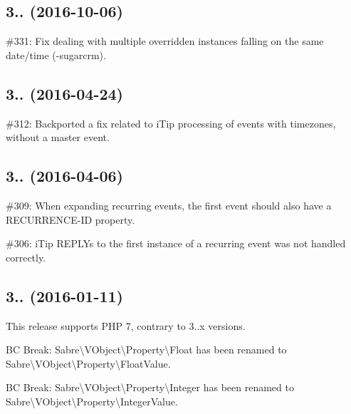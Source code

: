 \subsection*{3.. (2016-\/10-\/06) }


\begin{DoxyItemize}
\item \#331\+: Fix dealing with multiple overridden instances falling on the same date/time (-\/sugarcrm).
\end{DoxyItemize}

\subsection*{3.. (2016-\/04-\/24) }


\begin{DoxyItemize}
\item \#312\+: Backported a fix related to i\+Tip processing of events with timezones, without a master event.
\end{DoxyItemize}

\subsection*{3.. (2016-\/04-\/06) }


\begin{DoxyItemize}
\item \#309\+: When expanding recurring events, the first event should also have a {\ttfamily R\+E\+C\+U\+R\+R\+E\+N\+C\+E-\/\+ID} property.
\item \#306\+: i\+Tip R\+E\+P\+L\+Ys to the first instance of a recurring event was not handled correctly.
\end{DoxyItemize}

\subsection*{3.. (2016-\/01-\/11) }


\begin{DoxyItemize}
\item This release supports P\+HP 7, contrary to 3..\+x versions.
\item BC Break\+: {\ttfamily Sabre\textbackslash{}V\+Object\textbackslash{}Property\textbackslash{}Float} has been renamed to {\ttfamily Sabre\textbackslash{}V\+Object\textbackslash{}Property\textbackslash{}Float\+Value}.
\item BC Break\+: {\ttfamily Sabre\textbackslash{}V\+Object\textbackslash{}Property\textbackslash{}Integer} has been renamed to {\ttfamily Sabre\textbackslash{}V\+Object\textbackslash{}Property\textbackslash{}Integer\+Value}.
\end{DoxyItemize}

